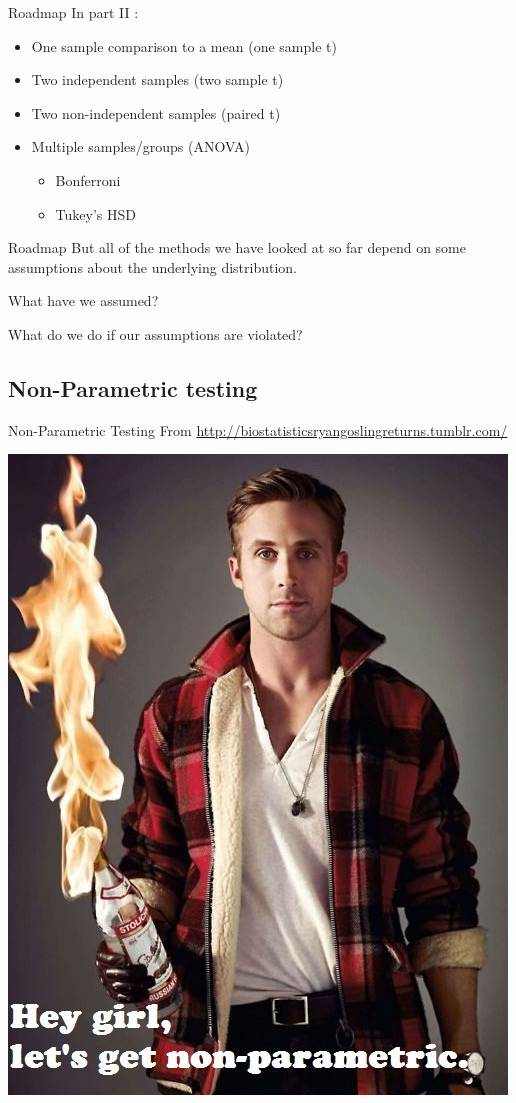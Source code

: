 \documentclass[
  ignorenonframetext,
  aspectratio=169]{beamer}
\providecommand{\tightlist}{%
  \setlength{\itemsep}{0pt}\setlength{\parskip}{0pt}}
\begin{document}
\begin{frame}{Roadmap}
\protect\hypertarget{roadmap}{}
In part II :

\begin{itemize}
\tightlist
\item
  One sample comparison to a mean (one sample t)
\item
  Two independent samples (two sample t)
\item
  Two non-independent samples (paired t)
\item
  Multiple samples/groups (ANOVA)

  \begin{itemize}
  \tightlist
  \item
    Bonferroni
  \item
    Tukey's HSD
  \end{itemize}
\end{itemize}
\end{frame}

\begin{frame}{Roadmap}
\protect\hypertarget{roadmap-1}{}
But all of the methods we have looked at so far depend on some
assumptions about the underlying distribution.

What have we assumed?

What do we do if our assumptions are violated?
\end{frame}

\hypertarget{non-parametric-testing}{%
\subsection{Non-Parametric testing}\label{non-parametric-testing}}

\begin{frame}{Non-Parametric Testing}
\protect\hypertarget{non-parametric-testing-1}{}
From \url{http://biostatisticsryangoslingreturns.tumblr.com/}

\begin{center}\includegraphics[width=0.6\linewidth]{./images/nonpara} \end{center}
\end{frame}
\end{document}
